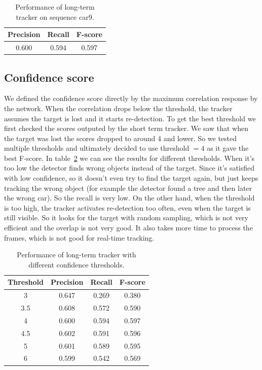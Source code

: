 \documentclass[9pt]{IEEEtran}
\begin{document}
\begin{table}[h!]
\centering
\begin{tabular}{|c|c|c|}
\hline
Precision & Recall & F-score \\
\hline
0.600 & 0.594 & 0.597 \\
\hline
\end{tabular}
\caption{Performance of long-term tracker on sequence car9.}\label{tab:siamfc_long}
\end{table}

\subsection{Confidence score}
We defined the confidence score directly by the maximum correlation response by the network. When the correlation
drops below the threshold, the tracker assumes the target is lost and it starts re-detection. To get
the best threshold we first checked the scores outputed by the short term tracker. We saw that when the target
was lost the scores dropped to around 4 and lower. So we tested multiple thresholds and ultimately decided to use
threshold $=4$ as it gave the best F-score. In table~\ref{tab:confidence} we can see the results for different thresholds.
When it's too low the detector finds wrong objects instead of the target. Since it's satisfied with low confidence,
so it doesn't even try to find the target again, but just keeps tracking the wrong object (for example the detector
found a tree and then later the wrong car). So the recall is very low. On the other hand, when the threshold is too high,
the tracker activates re-detection too often, even when the target is still visible. So it looks for the target with
random sampling, which is not very efficient and the overlap is not very good. It also takes more time to process the frames,
which is not good for real-time tracking.

\begin{table}[h!]
\centering
\begin{tabular}{c|c|c|c|}
\hline
Threshold & Precision & Recall & F-score \\
\hline
3 & 0.647 & 0.269 & 0.380 \\
3.5 & 0.608 & 0.572 & 0.590 \\
4 & 0.600 & 0.594 & 0.597 \\
4.5 & 0.602 & 0.591 & 0.596 \\
5 & 0.601 & 0.589 & 0.595 \\
6 & 0.599 & 0.542 & 0.569 \\
\hline
\end{tabular}
\caption{Performance of long-term tracker with different confidence thresholds.}\label{tab:confidence}
\end{table} 
\end{document}
